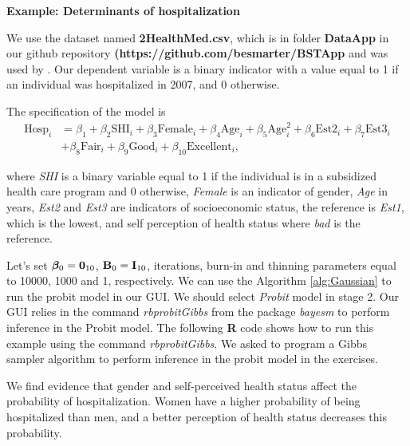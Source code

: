\textbf{Example: Determinants of hospitalization}

We use the dataset named \textbf{2HealthMed.csv}, which is in folder \textbf{DataApp} in our github repository \textbf{(https://github.com/besmarter/BSTApp} and was used by \cite{Ramirez2013}. Our dependent variable is a binary indicator with a value equal to 1 if an individual was hospitalized in 2007, and 0 otherwise.

The specification of the model is
\begin{align*}
	\text{Hosp}_i&={\beta}_1+{\beta}_2\text{SHI}_i+{\beta}_3\text{Female}_i+{\beta}_4\text{Age}_i+{\beta}_5\text{Age}_i^2+{\beta}_6\text{Est2}_i+{\beta}_7\text{Est3}_i\\
	&+{\beta}_8\text{Fair}_i+{\beta}_9\text{Good}_i+{\beta}_{10}\text{Excellent}_i,
\end{align*}

where \textit{SHI} is a binary variable equal to 1 if the individual is in a subsidized health care program and 0 otherwise, \textit{Female} is an indicator of gender, \textit{Age} in years, \textit{Est2} and \textit{Est3} are indicators of socioeconomic status, the reference is \textit{Est1}, which is the lowest, and self perception of health status where \textit{bad} is the reference.

Let's set $\bm{\beta}_0={\bf{0}}_{10}$, ${\bf{B}}_0={\bf{I}}_{10}$, iterations, burn-in and thinning parameters equal to 10000, 1000 and 1, respectively. We can use the Algorithm \ref{alg:Gaussian} to run the probit model in our GUI. We should select \textit{Probit} model in stage 2. Our GUI relies in the command \textit{rbprobitGibbs} from the package \textit{bayesm} to perform inference in the Probit model. The following \textbf{R} code shows how to run this example using the command \textit{rbprobitGibbs}. We asked to program a Gibbs sampler algorithm to perform inference in the probit model in the exercises.

We find evidence that gender and self-perceived health status affect the probability of hospitalization. Women have a higher probability of being hospitalized than men, and a better perception of health status decreases this probability.

